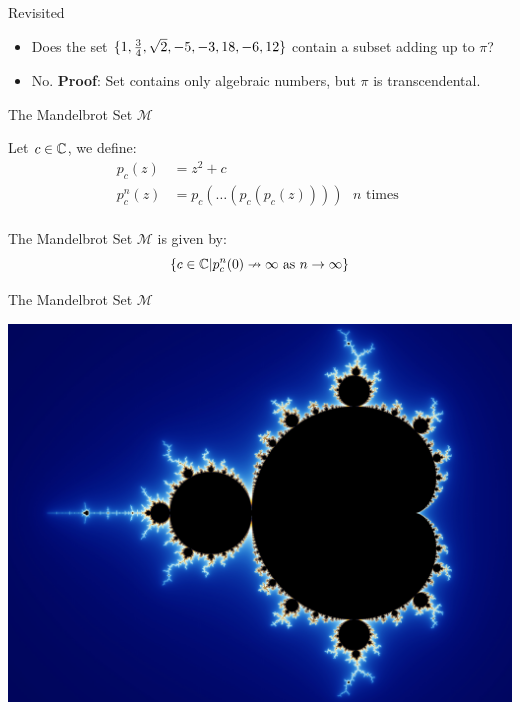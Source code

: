 \documentclass[c]{beamer}
\begin{document}
\begin{frame}{\subsum{} Revisited}
  
  \begin{itemize}
  \item Does the set $\{1,\frac{3}{4},\sqrt{2},-5,-3,18,-6,12\}$
    contain a subset adding up to $\pi$?\pause
  \item No. \textbf{Proof}: Set contains only algebraic numbers, but
    $\pi$ is transcendental.
  \end{itemize}
\end{frame}

\begin{frame}{The Mandelbrot Set $\mathcal{M}$}
  
  Let $c \in \mathbb{C}$, we define:
    \begin{align*}
      p_c(z) &= z^2 + c\\
      p_c^n(z) &= p_c(\ldots(p_c(p_c(z)))) \text{ $n$ times }\\
    \end{align*}
    
    \vspace{-\baselineskip}
    
    The Mandelbrot Set $\mathcal{M}$ is given by:
    $$\{c \in \mathbb{C} |p_c^n(0) \nrightarrow \infty \text{ as } n \rightarrow \infty\}$$
    
\end{frame}

\begin{frame}{The Mandelbrot Set $\mathcal{M}$}

  \includegraphics[width=\textwidth]{media/mandelbrot.jpg}
  
\end{frame}
\end{document}
